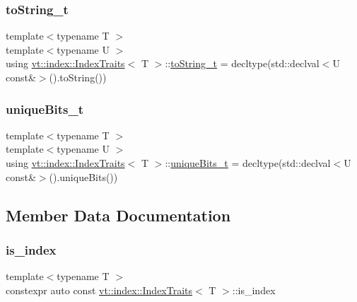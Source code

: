 \subsubsection{\texorpdfstring{to\+String\+\_\+t}{toString\_t}}
{\footnotesize\ttfamily template$<$typename T $>$ \\
template$<$typename U $>$ \\
using \hyperlink{structvt_1_1index_1_1_index_traits}{vt\+::index\+::\+Index\+Traits}$<$ T $>$\+::\hyperlink{structvt_1_1index_1_1_index_traits_afd3d724feb07329acc70afc067320558}{to\+String\+\_\+t} =  decltype(std\+::declval$<$U const\&$>$().to\+String())}

\mbox{\label{structvt_1_1index_1_1_index_traits_ac56a2e3919488b64e42a60e1684623aa}} 
\subsubsection{\texorpdfstring{unique\+Bits\+\_\+t}{uniqueBits\_t}}
{\footnotesize\ttfamily template$<$typename T $>$ \\
template$<$typename U $>$ \\
using \hyperlink{structvt_1_1index_1_1_index_traits}{vt\+::index\+::\+Index\+Traits}$<$ T $>$\+::\hyperlink{structvt_1_1index_1_1_index_traits_ac56a2e3919488b64e42a60e1684623aa}{unique\+Bits\+\_\+t} =  decltype(std\+::declval$<$U const\&$>$().unique\+Bits())}



\subsection{Member Data Documentation}
\mbox{\label{structvt_1_1index_1_1_index_traits_a254b0c96b3b6a75e56e3d7ddd3787621}} 
\subsubsection{\texorpdfstring{is\+\_\+index}{is\_index}}
{\footnotesize\ttfamily template$<$typename T $>$ \\
constexpr auto const \hyperlink{structvt_1_1index_1_1_index_traits}{vt\+::index\+::\+Index\+Traits}$<$ T $>$\+::is\+\_\+index\hspace{0.3cm}{\ttfamily [static]}}

